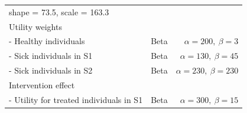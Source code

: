 \documentclass[
]{article}
\begin{document}
\begin{longtable}[]{@{}lrr@{}}
\begin{minipage}[t]{0.42\columnwidth}
shape = 73.5, scale = 163.3\strut
\end{minipage}\tabularnewline
\begin{minipage}[t]{0.32\columnwidth}\raggedright
Utility weights\strut
\end{minipage} & \begin{minipage}[t]{0.17\columnwidth}\raggedleft
\strut
\end{minipage} & \begin{minipage}[t]{0.42\columnwidth}\raggedleft
\strut
\end{minipage}\tabularnewline
\begin{minipage}[t]{0.32\columnwidth}\raggedright
- Healthy individuals\strut
\end{minipage} & \begin{minipage}[t]{0.17\columnwidth}\raggedleft
Beta\strut
\end{minipage} & \begin{minipage}[t]{0.42\columnwidth}\raggedleft
\(\alpha = 200, \ \beta = 3\)\strut
\end{minipage}\tabularnewline
\begin{minipage}[t]{0.32\columnwidth}\raggedright
- Sick individuals in S1\strut
\end{minipage} & \begin{minipage}[t]{0.17\columnwidth}\raggedleft
Beta\strut
\end{minipage} & \begin{minipage}[t]{0.42\columnwidth}\raggedleft
\(\alpha = 130, \ \beta = 45\)\strut
\end{minipage}\tabularnewline
\begin{minipage}[t]{0.32\columnwidth}\raggedright
- Sick individuals in S2\strut
\end{minipage} & \begin{minipage}[t]{0.17\columnwidth}\raggedleft
Beta\strut
\end{minipage} & \begin{minipage}[t]{0.42\columnwidth}\raggedleft
\(\alpha = 230, \ \beta = 230\)\strut
\end{minipage}\tabularnewline
\begin{minipage}[t]{0.32\columnwidth}\raggedright
Intervention effect\strut
\end{minipage} & \begin{minipage}[t]{0.17\columnwidth}\raggedleft
\strut
\end{minipage} & \begin{minipage}[t]{0.42\columnwidth}\raggedleft
\strut
\end{minipage}\tabularnewline
\begin{minipage}[t]{0.32\columnwidth}\raggedright
- Utility for treated individuals in S1\strut
\end{minipage} & \begin{minipage}[t]{0.17\columnwidth}\raggedleft
Beta\strut
\end{minipage} & \begin{minipage}[t]{0.42\columnwidth}\raggedleft
\(\alpha = 300, \ \beta = 15\)\strut
\end{minipage}\tabularnewline
\bottomrule
\end{longtable}
\end{document}

